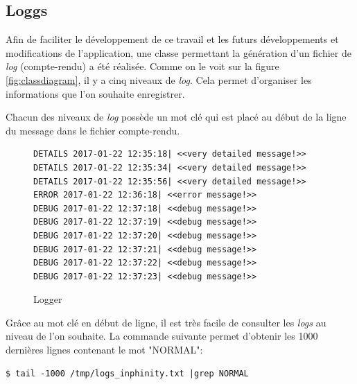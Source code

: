 \subsection{Loggs}
Afin de faciliter le développement de ce travail et les futurs développements et modifications de l'application, une classe permettant la génération d'un fichier de \emph{log} (compte-rendu) a été réalisée. Comme on le voit sur la figure \ref{fig:classdiagram}, il y a cinq niveaux de \emph{log}. Cela permet d'organiser les informations que l'on souhaite enregistrer.

Chacun des niveaux de \emph{log} possède un mot clé qui est placé au début de la ligne du message dans le fichier compte-rendu.

\lstset{language=bash}

\begin{figure}[H] 
\centering 
\begin{lstlisting}[frame=single]
DETAILS 2017-01-22 12:35:18| <<very detailed message!>>
DETAILS 2017-01-22 12:35:34| <<very detailed message!>>
DETAILS 2017-01-22 12:35:56| <<very detailed message!>>
ERROR 2017-01-22 12:36:18| <<error message!>>
DEBUG 2017-01-22 12:37:18| <<debug message!>>
DEBUG 2017-01-22 12:37:19| <<debug message!>>
DEBUG 2017-01-22 12:37:20| <<debug message!>>
DEBUG 2017-01-22 12:37:21| <<debug message!>>
DEBUG 2017-01-22 12:37:22| <<debug message!>>
DEBUG 2017-01-22 12:37:23| <<debug message!>>
\end{lstlisting}
\caption[Logger]{Logger}
\label{fig:logger} 
\end{figure}

Grâce au mot clé en début de ligne, il est très facile de consulter les \emph{logs} au niveau de l'on souhaite. La commande suivante permet d'obtenir les 1000 dernières lignes contenant le mot "NORMAL":

\begin{lstlisting}[frame=single]
$ tail -1000 /tmp/logs_inphinity.txt |grep NORMAL
\end{lstlisting}













































